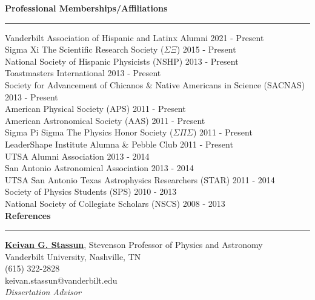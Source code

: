 \documentclass[letter,11pt]{article}
\begin{document}

 
\noindent
{\bf Professional Memberships/Affiliations} \\
\vspace{-10mm}
\begin{center}
\rule{\textwidth}{0.2mm}
\end{center}
\vspace{-3mm}
\noindent
Vanderbilt Association of Hispanic and Latinx Alumni \hfill 2021 - Present \\
Sigma Xi \text{\textbar} The Scientific Research Society ($\Sigma \Xi$) \hfill 2015 - Present \\
National Society of Hispanic Physicists (NSHP) \hfill 2013 - Present \\
Toastmasters International \hfill 2013 - Present \\
Society for Advancement of Chicanos \& Native Americans in Science (SACNAS) \hfill 2013 - Present  \\
American Physical Society (APS) \hfill 2011 - Present \\
American Astronomical Society (AAS) \hfill 2011 - Present \\
Sigma Pi Sigma \text{\textbar} The Physics Honor Society ($\Sigma \Pi \Sigma$) \hfill 2011 - Present \\
LeaderShape Institute Alumna \& Pebble Club \hfill 2011 - Present \\
UTSA Alumni Association \hfill 2013 - 2014 \\
San Antonio Astronomical Association \hfill 2013 - 2014 \\
UTSA San Antonio Texas Astrophysics Researchers (STAR) \hfill 2011 - 2014 \\
Society of Physics Students (SPS) \hfill 2010 - 2013 \\
National Society of Collegiate Scholars (NSCS) \hfill 2008 - 2013 \\


\noindent
{\bf References} \\
\vspace{-10mm}
\begin{center}
\rule{\textwidth}{0.2mm}
\end{center}
\vspace{-3mm}

\noindent
\href{http://astro.phy.vanderbilt.edu/~stassuk/}{\textbf{Keivan G. Stassun}}, Stevenson Professor of Physics and Astronomy \\
Vanderbilt University, Nashville, TN \\
(615) 322-2828 \\
keivan.stassun@vanderbilt.edu \\
\textit{Dissertation Advisor} \\
\end{document}
